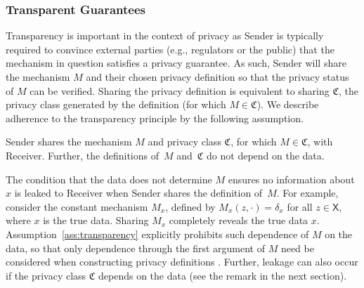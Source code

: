 \documentclass{article}
\theoremstyle{plain}
\theoremstyle{plain}
\theoremstyle{definition}
\theoremstyle{remark}
\theoremstyle{plain}
\begin{document}
\subsubsection{Transparent Guarantees}
Transparency is important in the context of privacy as Sender is typically required to convince external parties (e.g., regulators or the public) that the mechanism in question satisfies a privacy guarantee. As such, Sender will share the mechanism $M$ and their chosen privacy definition so that the privacy status of $M$ can be verified. Sharing the privacy definition is equivalent to sharing $\mathfrak{C}$, the privacy class generated by the definition (for which $M \in \mathfrak{C}$). We describe adherence to the transparency principle by the following assumption.
\begin{assumption}\label{ass:transparency}
    Sender shares the mechanism $M$ and privacy class $\mathfrak{C}$, for which $M \in \mathfrak{C}$, with Receiver. Further, the definitions of~$M$ and~$\mathfrak{C}$ do not depend on the data.
\end{assumption}
The condition that the data does not determine $M$ ensures no information about $x$ is leaked to Receiver when Sender shares the definition of~$M$. For example, consider the constant mechanism $M_x$, defined by $M_x(z,\cdot) = \delta_x$ for all $z \in \mathsf{X}$, where $x$ is the true data. Sharing 
$M_x$ completely reveals the true data $x$. Assumption~\ref{ass:transparency} explicitly prohibits such dependence of $M$ on the data, so that only dependence through the first argument of $M$ need be considered when constructing privacy definitions \citep{bailieRefreshmentStirredNot2024c}. Further, leakage can also occur if the privacy class $\mathfrak{C}$ depends on the data (see the remark in the next section).
\end{document}
